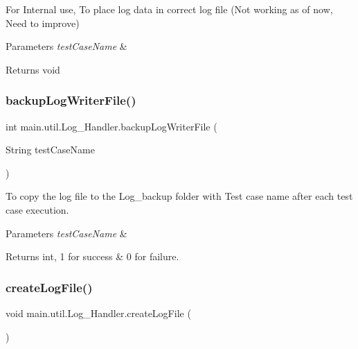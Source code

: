 For Internal use, To place log data in correct log file (Not working as of now, Need to improve) 
\begin{DoxyParams}{Parameters}
{\em test\+Case\+Name} & \\
\hline
\end{DoxyParams}
\begin{DoxyReturn}{Returns}
void 
\end{DoxyReturn}
\mbox{\label{classmain_1_1util_1_1_log___handler_ae7256f977793bd0847c9775bd81743a8}} 
\subsubsection{\texorpdfstring{backup\+Log\+Writer\+File()}{backupLogWriterFile()}}
{\footnotesize\ttfamily int main.\+util.\+Log\+\_\+\+Handler.\+backup\+Log\+Writer\+File (\begin{DoxyParamCaption}\item[{String}]{test\+Case\+Name }\end{DoxyParamCaption})}

To copy the log file to the Log\+\_\+backup folder with Test case name after each test case execution. 
\begin{DoxyParams}{Parameters}
{\em test\+Case\+Name} & \\
\hline
\end{DoxyParams}
\begin{DoxyReturn}{Returns}
int, 1 for success \& 0 for failure. 
\end{DoxyReturn}
\mbox{\label{classmain_1_1util_1_1_log___handler_a263af7d36015999901a87f057550020f}} 
\subsubsection{\texorpdfstring{create\+Log\+File()}{createLogFile()}}
{\footnotesize\ttfamily void main.\+util.\+Log\+\_\+\+Handler.\+create\+Log\+File (\begin{DoxyParamCaption}{ }\end{DoxyParamCaption})}

